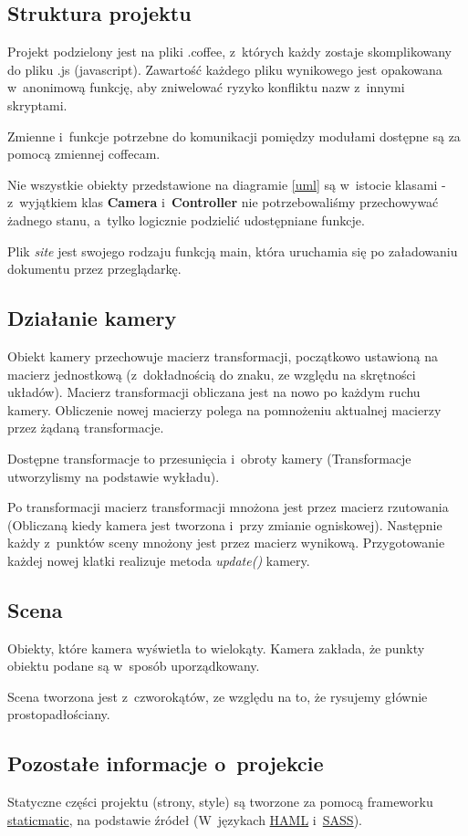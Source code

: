 \documentclass[a4paper]{article}
\begin{document}
{\subsection{Struktura projektu}

Projekt podzielony jest na pliki .coffee, z~których każdy zostaje skomplikowany do pliku .js (javascript).
Zawartość każdego pliku wynikowego jest opakowana w~anonimową funkcję, aby zniwelować ryzyko konfliktu nazw z~innymi skryptami.

Zmienne i~funkcje potrzebne do komunikacji pomiędzy modułami dostępne są za pomocą zmiennej coffecam.

Nie wszystkie obiekty przedstawione na diagramie \ref{uml} są w~istocie klasami - z~wyjątkiem klas \textbf{Camera} i~\textbf{Controller}
nie potrzebowaliśmy przechowywać żadnego stanu, a~tylko logicznie podzielić udostępniane funkcje.

Plik \emph{site} jest swojego rodzaju funkcją main, która uruchamia się po załadowaniu dokumentu przez przeglądarkę.


\subsection{Działanie kamery}
Obiekt kamery przechowuje macierz transformacji, początkowo ustawioną na macierz jednostkową (z~dokładnością do znaku, ze względu na skrętności układów)\cite{openGL}.
Macierz transformacji obliczana jest na nowo po każdym ruchu kamery. Obliczenie nowej macierzy polega na pomnożeniu aktualnej macierzy przez żądaną transformacje.

Dostępne transformacje to przesunięcia i~obroty kamery (Transformacje utworzylismy na podstawie wykładu\cite{dasa}).

Po transformacji macierz transformacji mnożona jest przez macierz rzutowania (Obliczaną kiedy kamera jest tworzona i~przy zmianie ogniskowej)\cite{openGL}.
Następnie każdy z~punktów sceny mnożony jest przez macierz wynikową.
Przygotowanie każdej nowej klatki realizuje metoda \emph{update()} kamery.

\subsection{Scena}
Obiekty, które kamera wyświetla to wielokąty.
Kamera zakłada, że punkty obiektu podane są w~sposób uporządkowany.

Scena tworzona jest z~czworokątów, ze względu na to, że rysujemy głównie prostopadłościany.
\newpage
\subsection{Pozostałe informacje o~projekcie}
Statyczne części projektu (strony, style) są tworzone za pomocą frameworku \href{http://staticmatic.rubyforge.org/}{staticmatic}, na podstawie źródeł (W~językach \href{http://haml-lang.com/}{HAML} i~\href{http://sass-lang.com/}{SASS}).

}
\end{document}
